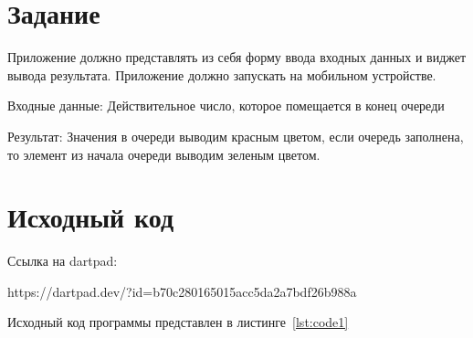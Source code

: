 \documentclass[a4paper, 14pt]{extarticle}
\begin{document}
\renewcommand{\ttdefault}{pcr}

\setlength{\tabcolsep}{3pt}
\newpage
\setcounter{page}{2}

\section{Задание}\label{Sect::task}
Приложение должно представлять из себя форму ввода входных данных и
виджет вывода результата. Приложение должно запускать на мобильном
устройстве.

Входные данные: Действительное число, которое помещается в конец очереди

Результат: Значения в очереди выводим красным цветом, если очередь заполнена, то элемент из начала очереди выводим зеленым цветом.
\newpage
\section{Исходный код}

Ссылка на dartpad:

https://dartpad.dev/?id=b70c280165015acc5da2a7bdf26b988a

Исходный код программы представлен в листинге~\ref{lst:code1}
\end{document}
